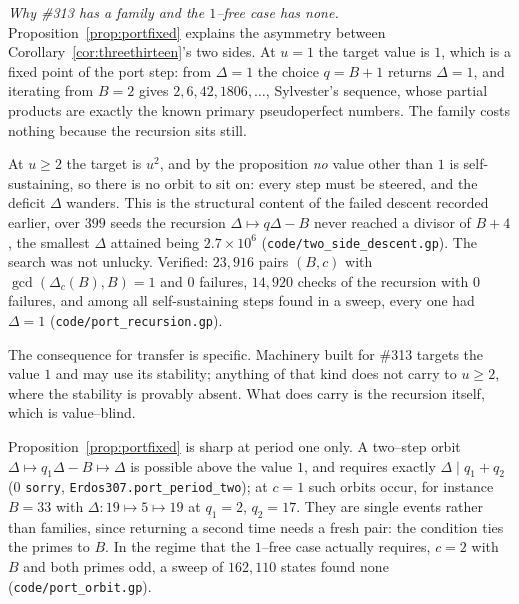 \documentclass[11pt]{article}
\theoremstyle{definition}
\begin{document}
\emph{Why \#313 has a family and the $1$--free case has none.} Proposition~\ref{prop:portfixed} explains the asymmetry between
Corollary~\ref{cor:threethirteen}'s two sides. At $u=1$ the target value is $1$, which is a fixed
point of the port step: from $\Delta=1$ the choice $q=B+1$ returns $\Delta=1$, and iterating from
$B=2$ gives $2,6,42,1806,\dots$, Sylvester's sequence, whose partial products are exactly the known
primary pseudoperfect numbers. The family costs nothing because the recursion sits still.

At $u\ge2$ the target is $u^{2}$, and by the proposition \emph{no} value other than $1$ is
self-sustaining, so there is no orbit to sit on: every step must be steered, and the deficit
$\Delta$ wanders. This is the structural content of the failed descent recorded earlier, over
$399$ seeds the recursion $\Delta\mapsto q\Delta-B$ never reached a divisor of $B+4$, the smallest
$\Delta$ attained being $2.7\times10^{6}$ \textup{(\texttt{code/two\_side\_descent.gp})}. The search
was not unlucky. Verified: $23{,}916$ pairs $(B,c)$ with $\gcd(\Delta_c(B),B)=1$ and $0$ failures,
$14{,}920$ checks of the recursion with $0$ failures, and among all self-sustaining steps found in a
sweep, every one had $\Delta=1$ \textup{(\texttt{code/port\_recursion.gp})}.

The consequence for transfer is specific. Machinery built for \#313 targets the value $1$ and may
use its stability; anything of that kind does not carry to $u\ge2$, where the stability is provably
absent. What does carry is the recursion itself, which is value--blind.

Proposition~\ref{prop:portfixed} is sharp at period one only. A two--step orbit
$\Delta\mapsto q_1\Delta-B\mapsto\Delta$ is possible above the value $1$, and requires exactly
$\Delta\mid q_1+q_2$ \textup{(}$0$ \texttt{sorry}, \texttt{Erdos307.port\_period\_two}\textup{)};
at $c=1$ such orbits occur, for instance $B=33$ with $\Delta:19\mapsto5\mapsto19$ at
$q_1=2$, $q_2=17$. They are single events rather than families, since returning a second time needs
a fresh pair: the condition ties the primes to $B$. In the regime that the $1$--free case actually
requires, $c=2$ with $B$ and both primes odd, a sweep of $162{,}110$ states found none
\textup{(\texttt{code/port\_orbit.gp})}.
\end{document}
